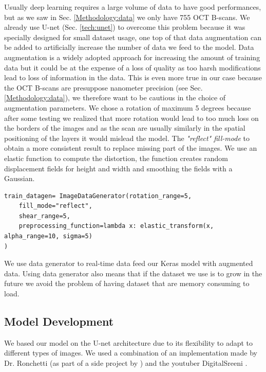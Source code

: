 \documentclass[12pt,a4paper]{scrartcl}
\begin{document}
Usually deep learning requires a large volume of data to have good performances, but as we saw in Sec. \ref{Methodology:data} we only have 755 OCT B-scans. We already use U-net (Sec. \ref{tech:unet}) to overcome this problem because it was specially designed for small dataset usage, one top of that data augmentation can be added to artificially increase the number of data we feed to the model. Data augmentation is a widely adopted approach for increasing the amount of training data \cite{AugAndEval:2017} but it could be at the expense of a loss of quality as too harsh modifications lead to loss of information in the data. This is even more true in our case because the OCT B-scans are presuppose nanometer precision (see Sec. \ref{Methodology:data}), we therefore want to be cautious in the choice of augmentation parameters.
We chose a rotation of maximum 5 degrees because after some testing we realized that more rotation would lead to too much loss on the borders of the images and as the scan are usually similarly in the spatial positioning of the layers it would mislead the model. The \emph{"reflect" fill-mode} to obtain a more consistent result to replace missing part of the images. We use an elastic function to compute the distortion, the function creates random displacement fields for height and width and smoothing the fields with a Gaussian. 
\begin{lstlisting}[caption={Base generator for image augmentation, the definition of the 2 seperate generator (image and mask) can be found in \emph{train.py}}]
train_datagen= ImageDataGenerator(rotation_range=5,
    fill_mode="reflect",
    shear_range=5,
    preprocessing_function=lambda x: elastic_transform(x, alpha_range=10, sigma=5)
)
\end{lstlisting}

We use data generator to real-time data feed our Keras model with augmented data. Using data generator also means that if the dataset we use is to grow in the future we avoid the problem of having dataset that are memory consuming to load.


\subsection{Model Development}

We based our model on the U-net architecture due to its flexibility to adapt to different types of images. We used a combination of an implementation made by Dr. Ronchetti (as part of a side project by \cite{Ronchetti2019}) and the youtuber DigitalSreeni \cite{DigitalSreeni}.
\end{document}
